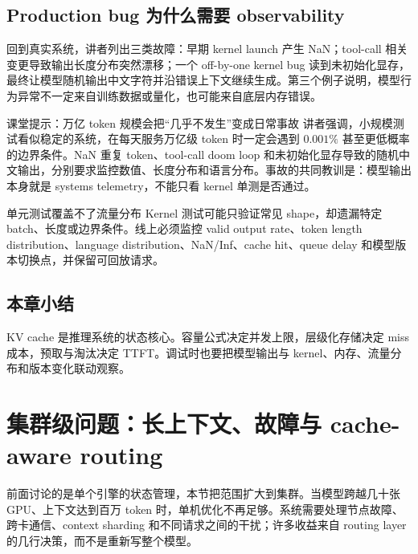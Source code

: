 \documentclass[a4paper]{article}
\begin{document}

\subsection{Production bug 为什么需要 observability}

回到真实系统，讲者列出三类故障：早期 kernel launch 产生 NaN；tool-call 相关变更导致输出长度分布突然漂移；一个 off-by-one kernel bug 读到未初始化显存，最终让模型随机输出中文字符并沿错误上下文继续生成。第三个例子说明，模型行为异常不一定来自训练数据或量化，也可能来自底层内存错误。

\begin{knowledgebox}{课堂提示：万亿 token 规模会把“几乎不发生”变成日常事故}
讲者强调，小规模测试看似稳定的系统，在每天服务万亿级 token 时一定会遇到 $0.001\%$ 甚至更低概率的边界条件。NaN 重复 token、tool-call doom loop 和未初始化显存导致的随机中文输出，分别要求监控数值、长度分布和语言分布。事故的共同教训是：模型输出本身就是 systems telemetry，不能只看 kernel 单测是否通过。
\end{knowledgebox}

\begin{warningbox}{单元测试覆盖不了流量分布}
Kernel 测试可能只验证常见 shape，却遗漏特定 batch、长度或边界条件。线上必须监控 valid output rate、token length distribution、language distribution、NaN/Inf、cache hit、queue delay 和模型版本切换点，并保留可回放请求。
\end{warningbox}

\subsection{本章小结}

KV cache 是推理系统的状态核心。容量公式决定并发上限，层级化存储决定 miss 成本，预取与淘汰决定 TTFT。调试时也要把模型输出与 kernel、内存、流量分布和版本变化联动观察。

\section{集群级问题：长上下文、故障与 cache-aware routing}

前面讨论的是单个引擎的状态管理，本节把范围扩大到集群。当模型跨越几十张 GPU、上下文达到百万 token 时，单机优化不再足够。系统需要处理节点故障、跨卡通信、context sharding 和不同请求之间的干扰；许多收益来自 routing layer 的几行决策，而不是重新写整个模型。
\end{document}
